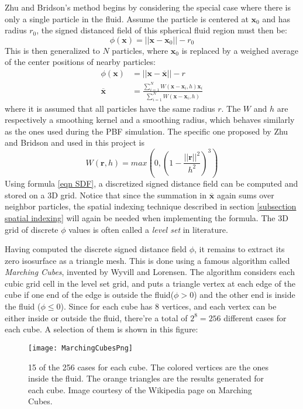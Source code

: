 Zhu and Bridson's method\cite{zhu2005animating} begins by considering the special case where there is only a single particle in the fluid. Assume the particle is centered at $\textbf{x}_0$ and has radius $r_0$, the signed distanced field of this spherical fluid region must then be:
$$
\phi(\textbf{x}) = ||\textbf{x}-\textbf{x}_0|| - r_0
$$
This is then generalized to $N$ particles, where $\textbf{x}_0$ is replaced by a weighed average of the center positions of nearby particles:
\begin{equation}
    \label{eqn SDF}
    \begin{aligned}
        \phi(\textbf{x}) &= ||\textbf{x}-\overline{\textbf{x}}|| - r \\
        \overline{\textbf{x}}&= \frac{\sum_{i=1}^{N} W(\textbf{x}-\textbf{x}_i,h)\textbf{x}_i}{\sum_{i=1}^{N} W(\textbf{x}-\textbf{x}_i,h)}
    \end{aligned}
\end{equation}
where it is assumed that all particles have the same radius $r$. The $W$ and $h$ are respectively a smoothing kernel and a smoothing radius, which behaves similarly as the ones used during the PBF simulation. The specific one proposed by Zhu and Bridson and used in this project is 
$$
W(\textbf{r},h) = max(0,(1-\frac{||\textbf{r}||^2}{h^2})^3) 
$$
Using formula \ref{eqn SDF}, a discretized signed distance field can be computed and stored on a 3D grid. Notice that since the summation in $\overline{\textbf{x}}$ again sums over neighbor particles, the spatial indexing technique described in section \ref{subsection spatial indexing} will again be needed when implementing the formula. The 3D grid of discrete $\phi$ values is often called a \textit{level set} in literature\cite{bridson2015fluid}.

Having computed the discrete signed distance field $\phi$, it remains to extract its zero isosurface as a triangle mesh. This is done using a famous algorithm called \textit{Marching Cubes}, invented by Wyvill\cite{wyvill1986soft} and Lorensen\cite{lorensen1987marching}. The algorithm considers each cubic grid cell in the level set grid, and puts a triangle vertex at each edge of the cube if one end of the edge is outside the fluid($\phi>0$) and the other end is inside the fluid ($\phi\leq 0$). Since for each cube has 8 vertices, and each vertex can be either inside or outside the fluid, there're a total of $2^8=256$ different cases for each cube. A selection of them is shown in this figure:

\begin{figure}[H]
    \centering
    \texttt{[image: MarchingCubesPng]}
    \caption{15 of the 256 cases for each cube. The colored vertices are the ones inside the fluid. The orange triangles are the results generated for each cube. Image courtesy of the Wikipedia page on Marching Cubes. }
    \label{figure marching cubes}
\end{figure}

